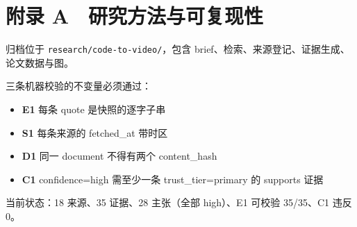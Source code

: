 \section{附录 A　研究方法与可复现性}

归档位于 \texttt{research/code-to-video/}，包含 brief、检索、来源登记、证据生成、论文数据与图。


三条机器校验的不变量必须通过：


\begin{itemize}
  \item \textbf{E1} 每条 quote 是快照的逐字子串
  \item \textbf{S1} 每条来源的 fetched\_at 带时区
  \item \textbf{D1} 同一 document 不得有两个 content\_hash
  \item \textbf{C1} confidence=high 需至少一条 trust\_tier=primary 的 supports 证据
\end{itemize}

当前状态：18 来源、35 证据、28 主张（全部 high）、E1 可校验 35/35、C1 违反 0。

